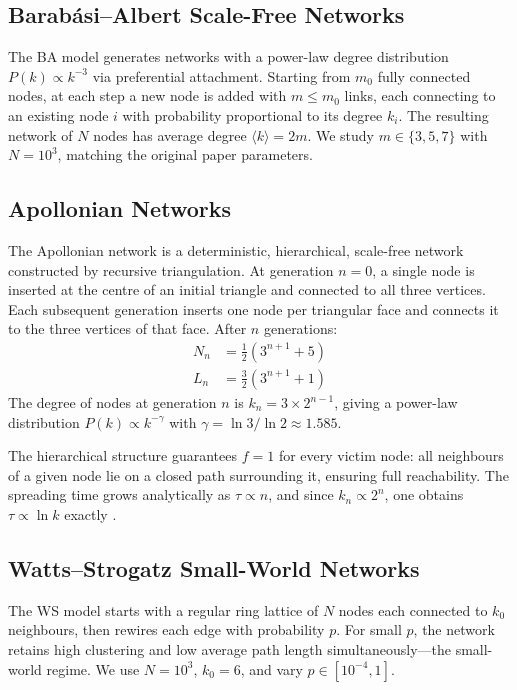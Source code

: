 \documentclass[9pt,a4paper,twocolumn,twoside]{tau-class/tau}
\begin{document}
\subsection{Barab\'asi--Albert Scale-Free Networks}

The BA model \cite{barabasi1999} generates networks with a power-law degree distribution $P(k) \propto k^{-3}$ via preferential attachment. Starting from $m_0$ fully connected nodes, at each step a new node is added with $m \leq m_0$ links, each connecting to an existing node $i$ with probability proportional to its degree $k_i$. The resulting network of $N$ nodes has average degree $\langle k \rangle = 2m$. We study $m \in \{3, 5, 7\}$ with $N = 10^3$, matching the original paper parameters.

\subsection{Apollonian Networks}

The Apollonian network \cite{andrade2005} is a deterministic, hierarchical, scale-free network constructed by recursive triangulation. At generation $n=0$, a single node is inserted at the centre of an initial triangle and connected to all three vertices. Each subsequent generation inserts one node per triangular face and connects it to the three vertices of that face. After $n$ generations:
\begin{align}
    N_n &= \frac{1}{2}(3^{n+1} + 5) \label{eq:Nn}\\
    L_n &= \frac{3}{2}(3^{n+1} + 1) \label{eq:Ln}
\end{align}
The degree of nodes at generation $n$ is $k_n = 3 \times 2^{n-1}$, giving a power-law distribution $P(k) \propto k^{-\gamma}$ with $\gamma = \ln 3 / \ln 2 \approx 1.585$.

The hierarchical structure guarantees $f = 1$ for every victim node: all neighbours of a given node lie on a closed path surrounding it, ensuring full reachability. The spreading time grows analytically as $\tau \propto n$, and since $k_n \propto 2^n$, one obtains $\tau \propto \ln k$ exactly \cite{lind2007pre}.

\subsection{Watts--Strogatz Small-World Networks}

The WS model \cite{watts1998} starts with a regular ring lattice of $N$ nodes each connected to $k_0$ neighbours, then rewires each edge with probability $p$. For small $p$, the network retains high clustering and low average path length simultaneously---the small-world regime. We use $N = 10^3$, $k_0 = 6$, and vary $p \in [10^{-4}, 1]$.
\end{document}
